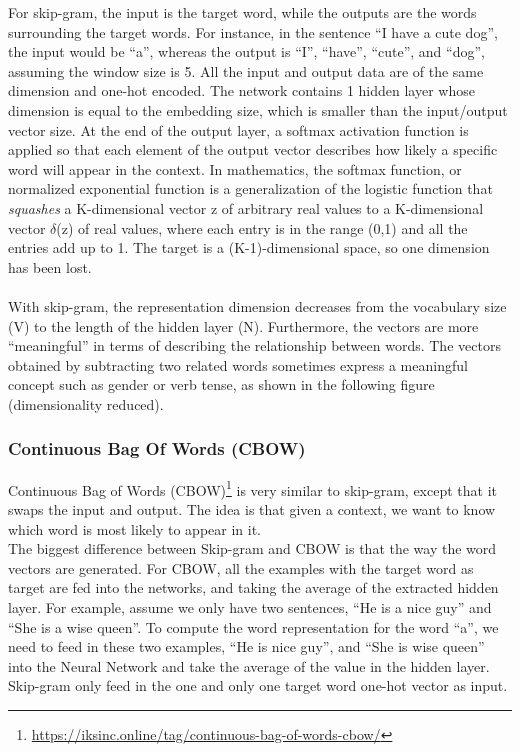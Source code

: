 For skip-gram, the input is the target word, while the outputs are the words surrounding the target words. For instance, in the sentence “I have a cute dog”, the input would be “a”, whereas the output is “I”, “have”, “cute”, and “dog”, assuming the window size is 5. All the input and output data are of the same dimension and one-hot encoded. The network contains 1 hidden layer whose dimension is equal to the embedding size, which is smaller than the input/output vector size. At the end of the output layer, a
softmax activation function is applied so that each element of the output vector describes how likely a specific word will appear in the context.
In mathematics, the softmax function, or normalized exponential function is a generalization of the logistic function that \textit{squashes} a K-dimensional vector z of arbitrary real values to a K-dimensional vector $\delta$(z) of real values, where each entry is in the range (0,1) and all the entries add up to 1. The target is a (K-1)-dimensional space, so one dimension has been lost.\\\\
With skip-gram, the representation dimension decreases from the vocabulary size (V) to the length of the hidden layer (N). Furthermore, the vectors are more “meaningful” in terms of describing the relationship between words. The vectors obtained by subtracting two related words sometimes express a meaningful concept such as gender or verb tense, as shown in the following figure (dimensionality reduced).

\subsubsection{Continuous Bag Of Words (CBOW)}

Continuous Bag of Words (CBOW)\footnote{\url{https://iksinc.online/tag/continuous-bag-of-words-cbow/}} is very similar to skip-gram, except that it swaps the input and output. The idea is that given a context, we want to know which word is most likely to appear in it.\\
The biggest difference between Skip-gram and CBOW is that the way the word vectors are generated. For CBOW, all the examples with the target word as target are fed into the networks, and taking the average of the extracted hidden layer. For example, assume we only have two sentences, “He is a nice guy” and “She is a wise queen”. To compute the word representation for the word “a”, we need to feed in these two examples, “He is nice guy”, and “She is wise queen” into the Neural Network and take the average of the value in the hidden layer. Skip-gram only feed in the one and only one target word one-hot vector as input.

